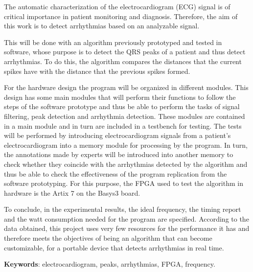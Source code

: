 The automatic characterization of the electrocardiogram (ECG) signal is of critical importance in patient monitoring and diagnosis. Therefore, the aim of this work is to detect arrhythmias based on an analyzable signal. 

This will be done with an algorithm previously prototyped and tested in software, whose purpose is to detect the QRS peaks of a patient and thus detect arrhythmias. To do this, the algorithm compares the distances that the current spikes have with the distance that the previous spikes formed.

For the hardware design the program will be organized in different modules. This design has some main modules that will perform their functions to follow the steps of the software prototype and thus be able to perform the tasks of signal filtering, peak detection and arrhythmia detection.
These modules are contained in a main module and in turn are included in a testbench for testing. The tests will be performed by introducing electrocardiogram signals from a patient's electrocardiogram into a memory module for processing by the program. In turn, the annotations made by experts will be introduced into another memory to check whether they coincide with the arrhythmias detected by the algorithm and thus be able to check the effectiveness of the program replication from the software prototyping. For this purpose, the FPGA used to test the algorithm in hardware is the Artix 7 on the Basys3 board.

To conclude, in the experimental results, the ideal frequency, the timing report and the watt consumption needed for the program are specified. According to the data obtained, this project uses very few resources for the performance it has and therefore meets the objectives of being an algorithm that can become customizable, for a portable device that detects arrhythmias in real time.

\noindent\textbf{Keywords}: electrocardiogram, peaks, arrhythmias, FPGA, frequency.